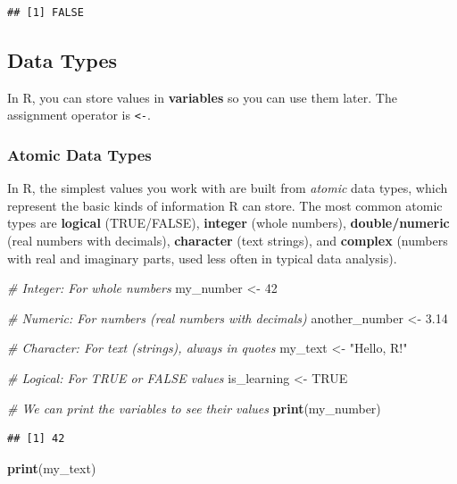 \documentclass[
  11pt,
]{article}
\newenvironment{Shaded}{\begin{snugshade}}{\end{snugshade}}
\newcommand{\CommentTok}[1]{\textcolor[rgb]{0.56,0.35,0.01}{\textit{#1}}}
\newcommand{\ConstantTok}[1]{\textcolor[rgb]{0.56,0.35,0.01}{#1}}
\newcommand{\DecValTok}[1]{\textcolor[rgb]{0.00,0.00,0.81}{#1}}
\newcommand{\FloatTok}[1]{\textcolor[rgb]{0.00,0.00,0.81}{#1}}
\newcommand{\FunctionTok}[1]{\textcolor[rgb]{0.13,0.29,0.53}{\textbf{#1}}}
\newcommand{\NormalTok}[1]{#1}
\newcommand{\OtherTok}[1]{\textcolor[rgb]{0.56,0.35,0.01}{#1}}
\newcommand{\StringTok}[1]{\textcolor[rgb]{0.31,0.60,0.02}{#1}}
\begin{document}
\begin{verbatim}
## [1] FALSE
\end{verbatim}

\subsection{Data Types}\label{data-types}

In R, you can store values in \textbf{variables} so you can use them
later. The assignment operator is \texttt{\textless{}-}.

\subsubsection{Atomic Data Types}\label{atomic-data-types}

In R, the simplest values you work with are built from \emph{atomic}
data types, which represent the basic kinds of information R can store.
The most common atomic types are \textbf{logical} (TRUE/FALSE),
\textbf{integer} (whole numbers), \textbf{double/numeric} (real numbers
with decimals), \textbf{character} (text strings), and \textbf{complex}
(numbers with real and imaginary parts, used less often in typical data
analysis).

\begin{Shaded}
\begin{Highlighting}[]
\CommentTok{\# Integer: For whole numbers}
\NormalTok{my\_number }\OtherTok{\textless{}{-}} \DecValTok{42}

\CommentTok{\# Numeric: For numbers (real numbers with decimals)}
\NormalTok{another\_number }\OtherTok{\textless{}{-}} \FloatTok{3.14}

\CommentTok{\# Character: For text (strings), always in quotes}
\NormalTok{my\_text }\OtherTok{\textless{}{-}} \StringTok{"Hello, R!"}

\CommentTok{\# Logical: For TRUE or FALSE values}
\NormalTok{is\_learning }\OtherTok{\textless{}{-}} \ConstantTok{TRUE}

\CommentTok{\# We can print the variables to see their values}
\FunctionTok{print}\NormalTok{(my\_number)}
\end{Highlighting}
\end{Shaded}

\begin{verbatim}
## [1] 42
\end{verbatim}

\begin{Shaded}
\begin{Highlighting}[]
\FunctionTok{print}\NormalTok{(my\_text)}
\end{Highlighting}
\end{Shaded}
\end{document}
